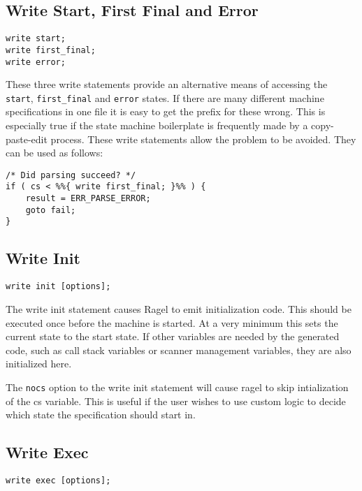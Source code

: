 \documentclass[letterpaper,11pt,oneside]{book}
\newcommand{\verbspace}{\vspace{10pt}}
\begin{document}
\subsection{Write Start, First Final and Error}

\begin{verbatim}
write start;
write first_final;
write error;
\end{verbatim}
\verbspace

These three write statements provide an alternative means of accessing the
\verb|start|, \verb|first_final| and \verb|error| states. If there are many
different machine specifications in one file it is easy to get the prefix for
these wrong. This is especially true if the state machine boilerplate is
frequently made by a copy-paste-edit process. These write statements allow the
problem to be avoided. They can be used as follows:

\verbspace

{
\small
\begin{verbatim}
/* Did parsing succeed? */
if ( cs < %%{ write first_final; }%% ) {
    result = ERR_PARSE_ERROR;
    goto fail;
}
\end{verbatim}
}
  

\subsection{Write Init}
\begin{verbatim}
write init [options];
\end{verbatim}
\verbspace

The write init statement causes Ragel to emit initialization code. This should
be executed once before the machine is started. At a very minimum this sets the
current state to the start state. If other variables are needed by the
generated code, such as call stack variables or scanner management
variables, they are also initialized here.

The \verb|nocs| option to the write init statement will cause ragel to skip
intialization of the cs variable. This is useful if the user wishes to use
custom logic to decide which state the specification should start in.

\subsection{Write Exec}
\begin{verbatim}
write exec [options];
\end{verbatim}
\verbspace
\end{document}
